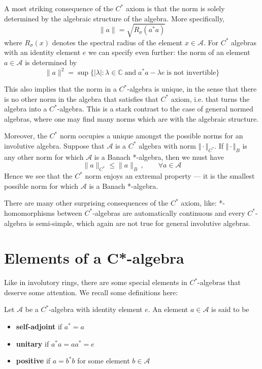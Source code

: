 \documentclass[12pt]{article}
\newcommand*{\norm}[1]{\Vert #1\Vert}
\theoremstyle{inlinedefn}
\theoremstyle{break}
\begin{document}
A most striking consequence of the $C^*$ axiom is that the norm is solely determined by the algebraic structure of the algebra. More specifically,
\begin{displaymath}
\|a\| = \sqrt{R_{\sigma}(a^*a)}
\end{displaymath}
where $R_{\sigma}(x)$ denotes the spectral radius of the element $x \in \mathcal{A}$. For $C^*$ algebras with an identity element $e$ we can specify even further: the norm of an element $a \in \mathcal{A}$ is determined by
\begin{displaymath}
\|a\|^2 = \sup \{ |\lambda|: \lambda \in \mathbb{C} \;\text{and}\; a^*a- \lambda e \;\text{is not invertible}\}
\end{displaymath}

This also implies that the norm in a $C^*$-algebra is unique, in the sense that there is no other norm in the algebra that satisfies that $C^*$ axiom, i.e. that turns the algebra into a $C^*$-algebra. This is a stark contrast to the case 
of general normed algebras, where one may find many norms which are
 with the algebraic structure.

Moreover, the $C^*$ norm occupies a unique  amongst the possible
norms for an involutive algebra.  Suppose that $\mathcal{A}$ is a $C^*$ algebra
with norm $\norm{\cdot}_{C^*}$.  If $\norm{\cdot}_{B}$ is
any other norm for which $\mathcal{A}$ is a Banach *-algebra, then we must have
\begin{displaymath}
\|a\|_{C^*} \leq \|a\|_B \,, \qquad \forall a \in \mathcal{A}
\end{displaymath}
Hence we see that the $C^*$ norm enjoys an extremal property --- it
is the smallest possible norm for which $\mathcal{A}$ is a Banach *-algebra.

There are many other surprising consequences of the $C^*$ axiom, like: *-homomorphisms between $C^*$-algebras are automatically continuous and every $C^*$-algebra is semi-simple, which again are not true for general involutive algebras.

\section{Elements of a C*-algebra}

Like in involutory rings, there are some special elements in $C^*$-algebras that deserve some attention. We recall some definitions here:

Let $\mathcal{A}$ be a $C^*$-algebra with identity element $e$. An element $a \in \mathcal{A}$ is said to be
\begin{itemize}
\item {\bf self-adjoint} if $a^* = a$
\item {\bf unitary} if $a^*a = aa^* = e$
\item {\bf positive} if $a = b^*b$ for some element $b \in \mathcal{A}$
\end{itemize}
\end{document}
